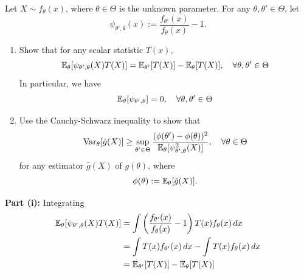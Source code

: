 \documentclass{article}
\begin{document}
\pagebreak
\begin{homeworkProblem}
  Let $X \sim f_\theta(x)$, where $\theta \in \Theta$ is the unknown parameter. For any $\theta, \theta' \in \Theta$, let
  \[
    \psi_{\theta', \theta} (x) := \frac{f_{\theta'}(x)}{f_\theta(x)} - 1.
  \]
  \begin{enumerate}[label=\roman*), topsep=5pt, itemsep=5pt]
    \item Show that for any scalar statistic $T(x)$,
          \[
            \mathbb{E}_\theta[\psi_{\theta', \theta}(X)T(X)] = \mathbb{E}_{\theta'}[T(X)] - \mathbb{E}_\theta[T(X)], \quad \forall\theta,\theta' \in \Theta
          \]
          In particular, we have
          \[
            \mathbb{E}_\theta[\psi_{\theta',\theta}] = 0, \quad \forall\theta,\theta'\in\Theta
          \]
    \item Use the Cauchy-Schwarz inequality to show that
          \[
            \operatorname{Var}_\theta[\hat{g}(X)] \geq \sup_{\theta' \in \Theta} \frac{(\phi(\theta') - \phi(\theta))^2}{\mathbb{E}_\theta[\psi_{\theta',\theta}^2(X)]}, \quad \forall\theta\in\Theta
          \]
          for any estimator $\hat{g}(X)$ of $g(\theta)$, where
          \[
            \phi(\theta) := \mathbb{E}_\theta[\hat{g}(X)].
          \]
  \end{enumerate}

  \solution

  \textbf{Part (i):} Integrating
  \begin{align*}
    \mathbb{E}_\theta[\psi_{\theta^{\prime}, \theta}(X) T(X)] & = \int \left(\frac{f_{\theta'}(x)}{f_\theta(x)} - 1\right) T(x) f_\theta(x) \, dx \\
                                                      & = \int T(x) f_{\theta'}(x) \, dx  - \int T(x) f_\theta(x) \, dx                   \\
                                                      & = \mathbb{E}_{\theta'}[T(X)] - \mathbb{E}_\theta[T(X)]
  \end{align*}

\end{homeworkProblem}

\pagebreak
\end{document}
